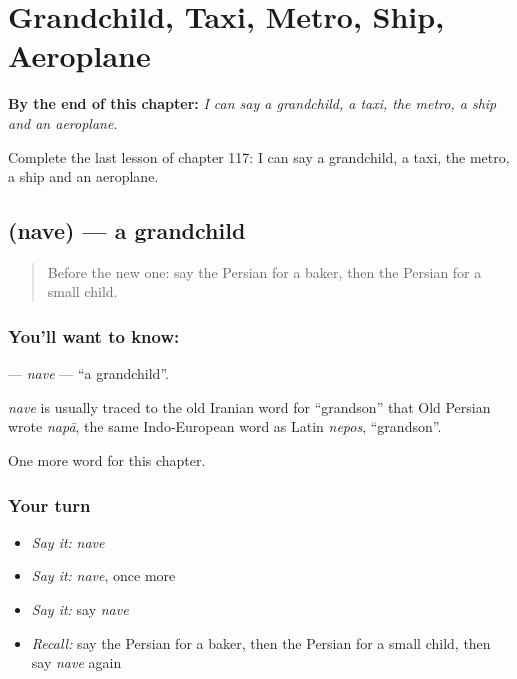 
\chapter{Grandchild, Taxi, Metro, Ship, Aeroplane}
\label{ch:fa-grandchild-taxi-metro-ship-aeroplane}

\begin{chapteropening}
\textbf{By the end of this chapter:} \emph{I can say a grandchild, a taxi, the metro, a ship and an aeroplane.}

Complete the last lesson of chapter 117: I can say a grandchild, a taxi, the metro, a ship and an aeroplane.
\end{chapteropening}

\section[\texorpdfstring{\fa{نوه} (nave)}{نوه (nave)}]{ (nave) — a grandchild}

\label{lesson:FA-C117-nave}



\begin{quote}
Before the new one: say the Persian for a baker, then the Persian for a small child.
\end{quote}

\subsection*{You'll want to know: }
\textbf{} — \emph{nave} — \textquotedblleft{}a grandchild\textquotedblright{}.

\begin{cousinweb}
\emph{nave} is usually traced to the old Iranian word for \textquotedblleft{}grandson\textquotedblright{} that Old Persian wrote \emph{napā}, the same Indo-European word as Latin \emph{nepos}, \textquotedblleft{}grandson\textquotedblright{}.
\end{cousinweb}

\begin{grammarlens}[title={What you've built}]
One more word for this chapter.
\end{grammarlens}

\subsection*{Your turn}
\begin{itemize}
\raggedright
  \item \emph{Say it:} \emph{nave}
  \item \emph{Say it:} \emph{nave}, once more
  \item \emph{Say it:} say \emph{nave}
  \item \emph{Recall:} say the Persian for a baker, then the Persian for a small child, then say \emph{nave} again
\end{itemize}

